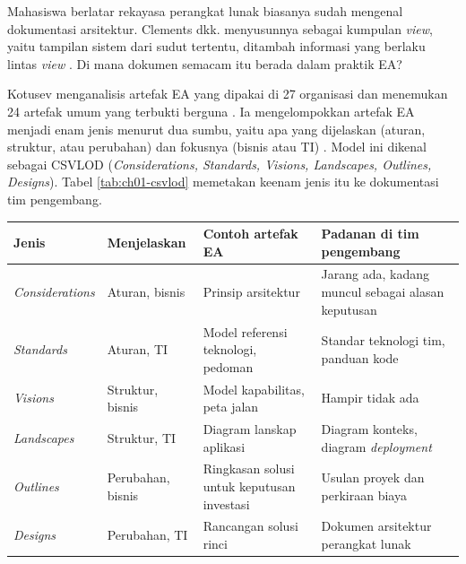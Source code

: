 \begin{pendalaman}[title={Pendalaman Teknis (opsional): Dokumentasi Arsitektur Perangkat Lunak dan Artefak EA}]
  Mahasiswa berlatar rekayasa perangkat lunak biasanya sudah mengenal
  dokumentasi arsitektur. Clements dkk. menyusunnya sebagai kumpulan
  \textit{view}, yaitu tampilan sistem dari sudut tertentu, ditambah informasi
  yang berlaku lintas \textit{view} \cite{c01-clements2010}. Di mana dokumen
  semacam itu berada dalam praktik EA?

  Kotusev menganalisis artefak EA yang dipakai di 27 organisasi dan menemukan
  24 artefak umum yang terbukti berguna \cite{kotusev2019}. Ia mengelompokkan
  artefak EA menjadi enam jenis menurut dua sumbu, yaitu apa yang dijelaskan
  (aturan, struktur, atau perubahan) dan fokusnya (bisnis atau TI)
  \cite{kotusev2021}. Model ini dikenal sebagai CSVLOD (\textit{Considerations,
  Standards, Visions, Landscapes, Outlines, Designs}). Tabel
  \ref{tab:ch01-csvlod} memetakan keenam jenis itu ke dokumentasi tim
  pengembang.

  \begin{center}
    \label{tab:ch01-csvlod}
    \footnotesize
    \begin{tabularx}{\linewidth}{>{\raggedright\arraybackslash}p{1.7cm}
        >{\raggedright\arraybackslash}p{1.8cm} >{\raggedright\arraybackslash}X
        >{\raggedright\arraybackslash}X}
      \hline
      \textbf{Jenis} & \textbf{Menjelaskan} & \textbf{Contoh artefak EA} & \textbf{Padanan di tim pengembang} \\
      \hline
      \textit{Con\-sid\-er\-a\-tions} & Aturan, bisnis & Prinsip arsitektur & Jarang ada, kadang muncul sebagai alasan keputusan \\
      \hline
      \textit{Standards} & Aturan, TI & Model referensi teknologi, pedoman & Standar teknologi tim, panduan kode \\
      \hline
      \textit{Visions} & Struktur, bisnis & Model kapabilitas, peta jalan & Hampir tidak ada \\
      \hline
      \textit{Landscapes} & Struktur, TI & Diagram lanskap aplikasi & Diagram konteks, diagram \textit{deployment} \\
      \hline
      \textit{Outlines} & Perubahan, bisnis & Ringkasan solusi untuk keputusan investasi & Usulan proyek dan perkiraan biaya \\
      \hline
      \textit{Designs} & Perubahan, TI & Rancangan solusi rinci & Dokumen arsitektur perangkat lunak \\
      \hline
    \end{tabularx}
  \end{center}


\end{pendalaman}
